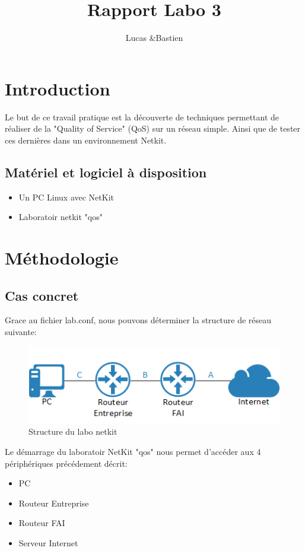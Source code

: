 \documentclass{article}
\title{Rapport Labo 3}
\author{Lucas \bsc{Bulloni} \&Bastien \bsc{Wermeille}}
\begin{document}
\maketitle

 

\section{Introduction}
 Le but de ce travail pratique est la découverte de techniques permettant de réaliser de la "Quality of Service" (QoS) sur un réseau simple. Ainsi que de tester ces dernières dans un environnement Netkit.

\subsection{Matériel et logiciel à disposition}
\begin{itemize}
	\item Un PC Linux avec NetKit
	\item Laboratoir netkit "qos"
\end{itemize}

\section{Méthodologie}

\subsection{Cas concret}
Grace au fichier lab.conf, nous pouvons déterminer la structure de réseau suivante:
\begin{figure}[h]
  \centering
  \includegraphics{./Structure.png}
  \caption{Structure du labo netkit}
  \label{fig:structure}
\end{figure}

Le démarrage du laboratoir NetKit "qos" nous permet d'accéder aux 4 périphériques précédement décrit:
\begin{itemize}
	\item PC
	\item Routeur Entreprise
	\item Routeur FAI
	\item Serveur Internet
\end{itemize}
\end{document}
